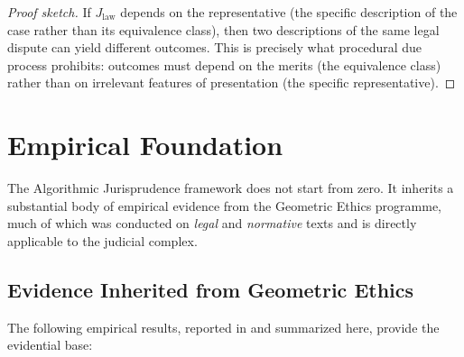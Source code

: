\documentclass[12pt]{article}
\theoremstyle{definition}
\theoremstyle{remark}
\begin{document}
\begin{proof}[Proof sketch]
If $J_{\text{law}}$ depends on the representative (the specific description of the case rather than its equivalence class), then two descriptions of the same legal dispute can yield different outcomes.  This is precisely what procedural due process prohibits: outcomes must depend on the merits (the equivalence class) rather than on irrelevant features of presentation (the specific representative).
\end{proof}


\section{Empirical Foundation}
\label{sec:empirical}

The Algorithmic Jurisprudence framework does not start from zero.  It inherits a substantial body of empirical evidence from the Geometric Ethics programme, much of which was conducted on \emph{legal} and \emph{normative} texts and is directly applicable to the judicial complex.

\subsection{Evidence Inherited from Geometric Ethics}

The following empirical results, reported in \cite{bond2026geometric} and summarized here, provide the evidential base:
\end{document}
